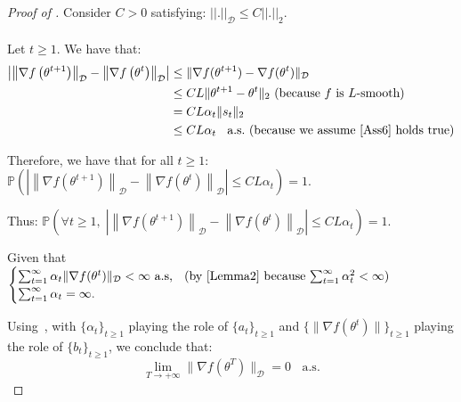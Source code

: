 \documentclass{article} %
\begin{document}
\begin{proof}[Proof of ]

Consider $C > 0$ satisfying: $
||.||_{\mathcal{D} } \le C ||.||_2$.\\\\
Let $t\ge 1.$ We have that:
\begin{align*}
    \left|\left\|\nabla f\left(\theta^{t+1}\right)\right\|_{\mathcal{D}}-\left\|\nabla f\left(\theta^t\right)\right\|_{\mathcal{D}}\right| &\le \lVert \nabla f(\theta^{t+1})-\nabla f(\theta^t) \rVert_{\mathcal{D}} \\
    &\le C L \lVert \theta^{t+1}-\theta^t \rVert_{2} \text{ (because } f \text{ is } L\text{-smooth)}\\
    &= CL\alpha_t \lVert s_t \rVert_{2}\\
    &\le CL\alpha_t \;\; \text{ a.s.}  \text{  (because we assume~\Cref{Ass6} holds true)}
\end{align*}

Therefore, we have that for all $t \ge 1$: $\mathbb{P}\left( 
 \left|\left\|\nabla f\left(\theta^{t+1}\right)\right\|_{\mathcal{D}}-\left\|\nabla f\left(\theta^t\right)\right\|_{\mathcal{D}}\right|  \le CL \alpha_t \right)=1.$ 
 
 Thus: $\mathbb{P}\left( \forall t \ge 1,\;  
 \left|\left\|\nabla f\left(\theta^{t+1}\right)\right\|_{\mathcal{D}}-\left\|\nabla f\left(\theta^t\right)\right\|_{\mathcal{D}}\right|  \le CL \alpha_t \right)=1.$

Given that
$\begin{cases}
\sum_{t=1}^{\infty} \alpha_t   \lVert \nabla f(\theta^t) \rVert_{\mathcal{D}}< \infty \text { a.s, \; (by~\Cref{Lemma2} because $\sum_{t=1}^{ \infty} \alpha_t^2 <\infty$)}\\
    \sum_{t=1}^{\infty} \alpha_t=\infty .
\end{cases}$

Using~, with $\{\alpha_t\}_{t\ge 1}$ playing the role of $\{a_t\}_{t\ge 1}$ and $\{\lVert \nabla f(\theta^t) \rVert\}_{t\ge 1}$ playing the role of $\{b_t\}_{t\ge 1}$, we conclude that: $$\lim\limits_{T \rightarrow +\infty} \lVert \nabla f(\theta^T) \rVert_{\mathcal{D}}=0\;\; \text{ a.s.}$$ 
\end{proof}
\end{document}
